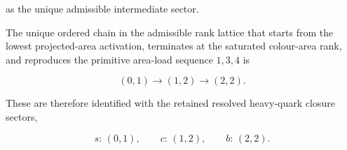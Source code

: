 \documentclass[11pt]{article}
\theoremstyle{definition}
\theoremstyle{remark}
\begin{document}
as the unique admissible intermediate sector.


The unique ordered chain in the admissible rank lattice that
starts from the lowest projected-area activation, terminates at
the saturated colour-area rank, and reproduces the primitive
area-load sequence \(1,3,4\) is

\begin{equation}
(0,1)
\longrightarrow
(1,2)
\longrightarrow
(2,2).
\label{eq:heavy_quark_retained_rank_chain}
\end{equation}

These are therefore identified with the retained resolved
heavy-quark closure sectors,

\begin{equation}
s:\,(0,1),
\qquad
c:\,(1,2),
\qquad
b:\,(2,2).
\label{eq:heavy_quark_rank_assignment}
\end{equation}
\end{document}
